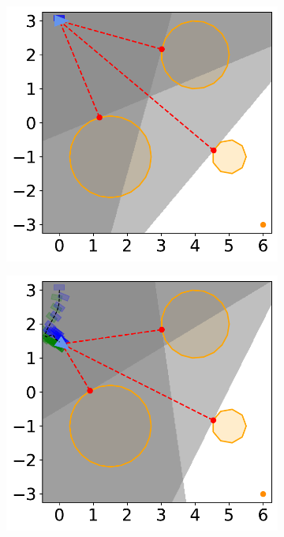 \begin{figure}[H]
    \centering
    \begin{subfigure}{0.35\textwidth}
        \centering
        \includegraphics[width=\textwidth]{figures/Simulations/sim1circles/frame_0.pdf}
    \end{subfigure}%
    \hspace{1em}
    \begin{subfigure}{0.35\textwidth}
        \centering
        \includegraphics[width=\textwidth]{figures/Simulations/sim1circles/frame_1.pdf}

\end{subfigure}
\end{figure}
